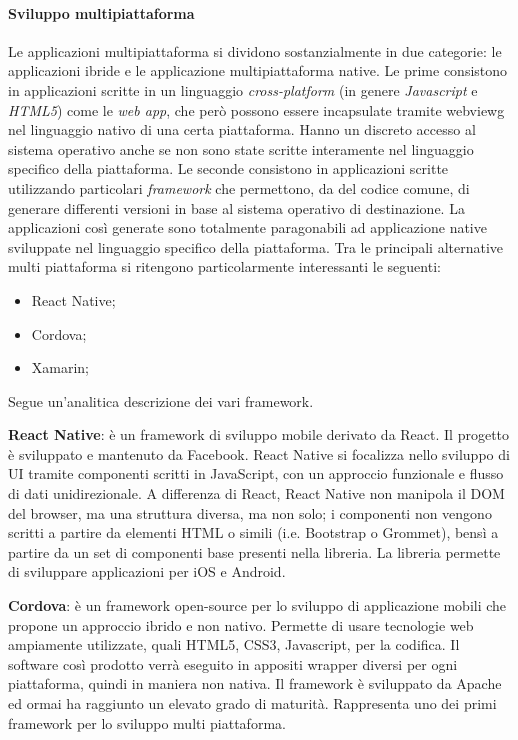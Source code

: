 \paragraph{Sviluppo multipiattaforma}
Le applicazioni multipiattaforma si dividono sostanzialmente in due categorie: le applicazioni ibride e le applicazione multipiattaforma native.
\medskip
Le prime consistono in applicazioni scritte in un linguaggio \emph{cross-platform} (in genere \emph{Javascript} e \emph{HTML5}) come le \emph{web app}, che però possono essere incapsulate tramite \gls{webviewg} nel linguaggio nativo di una certa piattaforma. Hanno un discreto accesso al sistema operativo anche se non sono state scritte interamente nel linguaggio specifico della piattaforma.
\medskip
Le seconde consistono in applicazioni scritte utilizzando particolari \emph{framework} che permettono, da del codice comune, di generare differenti versioni in base al sistema operativo di destinazione. La applicazioni così generate sono totalmente paragonabili ad applicazione native sviluppate nel linguaggio specifico della piattaforma. 
\medskip
Tra le principali alternative multi piattaforma si ritengono particolarmente interessanti le seguenti:
\begin{itemize}
    \item React Native;
    \item Cordova;
    \item Xamarin;
\end{itemize}
Segue un’analitica descrizione dei vari framework.

\textbf{React Native}: è un framework di sviluppo mobile derivato da React. Il progetto è sviluppato e mantenuto da Facebook. React Native si focalizza nello sviluppo di UI tramite componenti scritti in JavaScript, con un approccio funzionale e flusso di dati unidirezionale.  A differenza di React, React Native non manipola il DOM del browser, ma una struttura diversa, ma non solo; i componenti non vengono scritti a partire da elementi HTML o simili (i.e. Bootstrap o Grommet),  bensì a partire da un set di componenti base presenti nella libreria. La libreria permette di sviluppare applicazioni per iOS e Android.

\textbf{Cordova}: è un framework open-source per lo sviluppo di applicazione mobili che propone un approccio ibrido e non nativo. Permette di usare tecnologie web ampiamente utilizzate, quali HTML5, CSS3, Javascript, per la codifica. Il software così prodotto verrà eseguito in appositi wrapper diversi per ogni piattaforma, quindi in maniera non nativa. Il framework è sviluppato da Apache ed ormai ha raggiunto un elevato grado di maturità. Rappresenta uno dei primi framework per lo sviluppo multi piattaforma.

